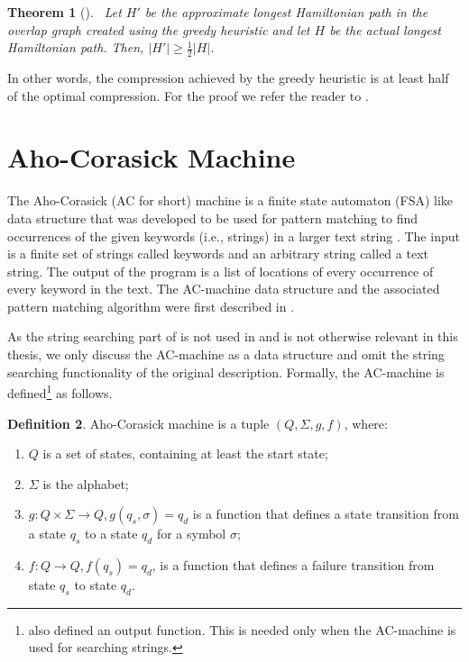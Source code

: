 \documentclass[english,twoside,censored,csm,algorithms-track-2020]{HYthesisML}
\theoremstyle{plain}
\newtheorem{theorem}{Theorem}[chapter]
\theoremstyle{definition}
\newtheorem{definition}[theorem]{Definition}
\begin{document}
\begin{theorem}[]~\label{theorem-heuristic-bound}
  Let $H'$ be the approximate longest Hamiltonian path in the overlap graph created using
  the greedy heuristic and let $H$ be the actual longest Hamiltonian path. Then,
  $|H'|\geq \frac{1}{2}|H|$.
\end{theorem}

In other words, the compression achieved by the greedy heuristic is at least half of the optimal
compression. 
For the proof we refer the reader to \citep{Tarhio88}.




\section{Aho-Corasick Machine}


  
The Aho-Corasick (AC for short) machine is a finite state automaton (FSA) like data structure that was
developed to be used
for pattern matching to find occurrences of the given keywords (i.e., strings) in a larger text string \citep{Aho75}.
The input is a finite set of strings called keywords and an
arbitrary string called a text string. The output of the program is a list of locations of every
occurrence of every keyword in the text. The AC-machine data structure and the associated pattern
matching algorithm were first described in \citep{Aho75}.

As the string searching part of \citep{Aho75} is not used in \citep{Ukkonen90} and is not otherwise
relevant in this thesis, we only discuss the AC-machine as a data structure and omit the string searching
functionality of the original description.
Formally, the AC-machine is defined\footnote{\citep{Aho75} also defined an output function.
This is needed only when the AC-machine is used for searching strings.} as follows.

\begin{definition}
  Aho-Corasick machine is a tuple $(Q, \Sigma, g, f)$, where:
\begin{enumerate}[leftmargin=28pt]
\item $Q$ is a set of states, containing at least the start state;
\item $\Sigma$ is the alphabet;
\item $g : Q \times \Sigma \rightarrow Q, g(q_s,\sigma) = q_d$ is a function that defines a state transition from a state $q_s$ to a state $q_d$ for a symbol $\sigma$;
\item $f : Q \rightarrow Q, f(q_s) = q_d$, is a function that defines a failure transition from state $q_s$ to state $q_d$.
\end{enumerate}
\end{definition}
\end{document}
